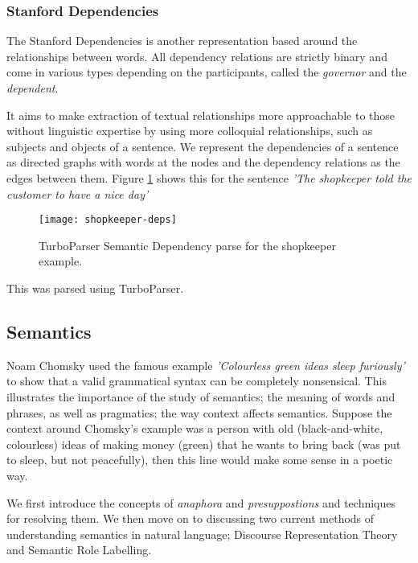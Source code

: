 \subsubsection{Stanford Dependencies}
\label{sec:stanford-deps}
The Stanford Dependencies\cite{de2008stanford} is another representation based around the relationships between words. All dependency relations are strictly binary and come in various types depending on the participants, called the \textit{governor} and the \textit{dependent}.

It aims to make extraction of textual relationships more approachable to those without linguistic expertise by using more colloquial relationships, such as subjects and objects of a sentence. We represent the dependencies of a sentence as directed graphs with words at the nodes and the dependency relations as the edges between them. Figure \ref{fig:shopkeeper-deps} shows this for the sentence \textit{'The shopkeeper told the customer to have a nice day'}

\begin{figure}[h!]
\centering
\texttt{[image: shopkeeper-deps]}
\caption{TurboParser Semantic Dependency parse for the shopkeeper example.}
\label{fig:shopkeeper-deps}
\end{figure}

This was parsed using TurboParser\cite{turboparser}.


\subsection{Semantics}
\label{sec:semantics}
Noam Chomsky used the famous example \textit{'Colourless green ideas sleep furiously'} to show that a valid grammatical syntax can be completely nonsensical\cite{chomsky2002syntactic}. This illustrates the importance of the study of semantics; the meaning of words and phrases, as well as pragmatics; the way context affects semantics. Suppose the context around Chomsky's example was a person with old (black-and-white, colourless) ideas of making money (green) that he wants to bring back (was put to sleep, but not peacefully), then this line would make some sense in a poetic way.

We first introduce the concepts of \textit{anaphora} and \textit{presuppostions} and techniques for resolving them. We then move on to discussing two current methods of understanding semantics in natural language; Discourse Representation Theory and Semantic Role Labelling.

